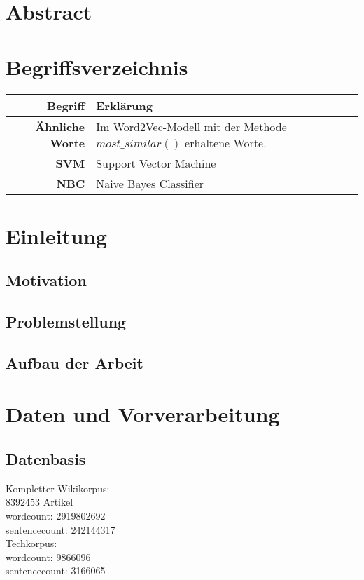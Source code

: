 \documentclass[12pt,a4paper]{report}
\begin{document}
\chapter*{Abstract}
\newpage
\tableofcontents
\newpage
\chapter*{Begriffsverzeichnis}
	\begin{tabular}{r|l}	
	\textbf{Begriff} & Erklärung\\
	\hline	
	\textbf{Ähnliche Worte} & Im Word2Vec-Modell mit der Methode $most\_similar()$ erhaltene Worte.\\
	\textbf{SVM} & Support Vector Machine\\
	\textbf{NBC} & Naive Bayes Classifier\\

\end{tabular}
\newpage
{}
\chapter{Einleitung}
	\section{Motivation}
	
	\section{Problemstellung}
	\section{Aufbau der Arbeit}

\newpage
\chapter{Daten und Vorverarbeitung}
	\section{Datenbasis}
	Kompletter Wikikorpus: \\
	8392453 Artikel\\
	wordcount: 2919802692\\
	sentencecount: 242144317\\
	
	Techkorpus:\\
	wordcount: 9866096\\
	sentencecount: 3166065\\
\end{document}
